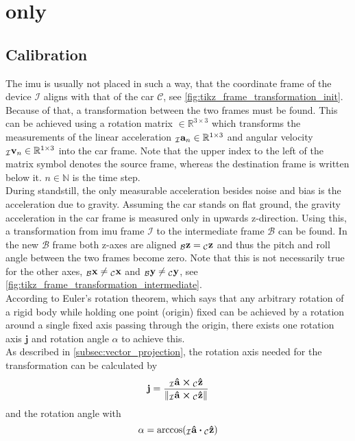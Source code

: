 \section{ only}
\subsection{Calibration}
The \gls{imu} is usually not placed in such a way, that the coordinate frame of the device $\mathcal{I}$ aligns with that of the car $\mathcal{C}$, see \cref{fig:tikz_frame_transformation_init}.
Because of that, a transformation between the two frames must be found.
This can be achieved using a rotation matrix  $\in \mathbb{R}^{3\times3}$ which transforms the measurements of the linear acceleration $\vincs{a}{I}_n \in \mathbb{R}^{1\times3}$ and angular velocity ${\vincs{v}{I}_n \in \mathbb{R}^{1\times3}}$ into the car frame.
Note that the upper index to the left of the matrix symbol denotes the source frame, whereas the destination frame is written below it.
$n \in \mathbb{N}$ is the time step.\\
During standstill, the only measurable acceleration besides noise and bias is the acceleration due to gravity.
Assuming the car stands on flat ground, the gravity acceleration in the car frame is measured only in upwards z-direction.
Using this, a transformation from \gls{imu} frame $\mathcal{I}$ to the intermediate frame $\mathcal{B}$ can be found.
In the new $\mathcal{B}$ frame both z-axes are aligned $\vincs{z}{b} = \vincs{z}{c}$ and thus the pitch and roll angle between the two frames become zero.
Note that this is not necessarily true for the other axes, $\vincs{x}{b}\neq\vincs{x}{c}$ and $\vincs{y}{b}\neq\vincs{y}{c}$, see \cref{fig:tikz_frame_transformation_intermediate}.\\
According to Euler's rotation theorem, which says that any arbitrary rotation of a rigid body while holding one point (origin) fixed can be achieved by a rotation around a single fixed axis passing through the origin, there exists one rotation axis $\mathbf{j}$ and rotation angle $\alpha$ to achieve this.\\
As described in \cref{subsec:vector_projection}, the rotation axis needed for the transformation can be calculated by
\begin{equation}
	\vb{j} = \frac{\vincs{\vu{a}}{i} \cp \vincs{\vu{z}}{c}}{\norm{\vincs{\vu{a}}{i} \cp \vincs{\vu{z}}{c}}}
\end{equation}
and the rotation angle with
\begin{equation}
	\alpha = \arccos(\vincs{\vu{a}}{i}\vdot \vincs{\vu{z}}{c})
\end{equation}
